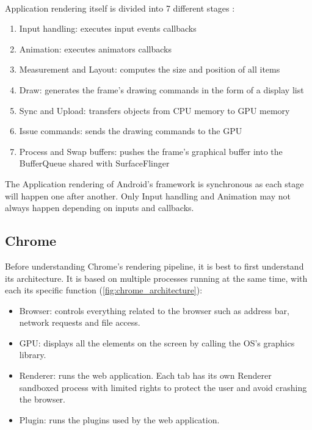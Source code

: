 \documentclass{kththesis}
\begin{document}
\paragraph{}
Application rendering itself is divided into 7 different stages \cite{app_rendering}:
\begin{enumerate}
    \item Input handling: executes input events callbacks
    \item Animation: executes animators callbacks
    \item Measurement and Layout: computes the size and position of all items
    \item Draw: generates the frame's drawing commands in the form of a display list
    \item Sync and Upload: transfers objects from CPU memory to GPU memory
    \item Issue commands: sends the drawing commands to the GPU
    \item Process and Swap buffers: pushes the frame's graphical buffer into the BufferQueue shared with SurfaceFlinger
\end{enumerate}

The Application rendering of Android's framework is synchronous as each stage will happen one after another. Only Input handling and Animation may not always happen depending on inputs and callbacks.

\subsection{Chrome}
Before understanding Chrome's rendering pipeline, it is best to first understand its architecture. It is based on multiple processes running at the same time, with each its specific function \cite{chrome_architecture} (\autoref{fig:chrome_architecture}):

\begin{itemize}
    \item Browser: controls everything related to the browser such as address bar, network requests and file access.
    \item GPU: displays all the elements on the screen by calling the OS's graphics library.
    \item Renderer: runs the web application. Each tab has its own Renderer sandboxed process with limited rights to protect the user and avoid crashing the browser.
    \item Plugin: runs the plugins used by the web application.
\end{itemize}
\end{document}
